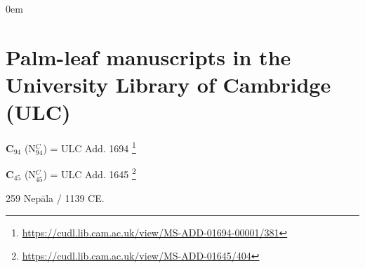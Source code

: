 \documentclass[11pt]{book} %
\begin{document}
\parindent0em


\section{Palm-leaf manuscripts in the University Library of Cambridge (ULC)}

{\large\textbf{C$_{\scriptscriptstyle 94}$} 
(N$^{\scriptscriptstyle C}_{\scriptscriptstyle 94}$) = 
ULC Add. 1694}%
     \footnote{\url{https://cudl.lib.cam.ac.uk/view/MS-ADD-01694-00001/381}}
\bigskip

{\large\textbf{C$_{\scriptscriptstyle 45}$} 
(N$^{\scriptscriptstyle C}_{\scriptscriptstyle 45}$) = 
ULC Add. 1645}%
     \footnote{\url{https://cudl.lib.cam.ac.uk/view/MS-ADD-01645/404}}
\bigskip

259 Nepāla / 1139 CE.
\end{document}
